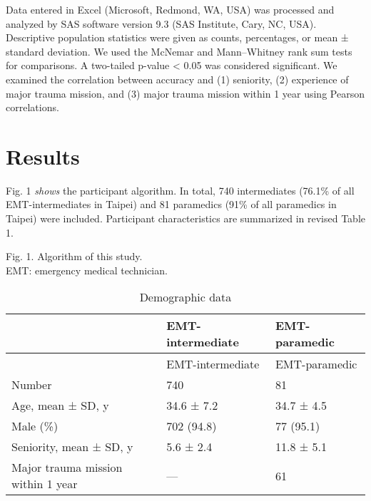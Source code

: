\documentclass[
  20pt
]{article}
\begin{document}
\begin{multicols}{2}
Data entered in Excel (Microsoft, Redmond, WA, USA) was processed and
analyzed by SAS software version 9.3 (SAS Institute, Cary, NC, USA).
Descriptive population statistics were given as counts, percentages, or
mean ± standard deviation. We used the McNemar and Mann--Whitney rank
sum tests for comparisons. A two-tailed p-value \textless{} 0.05 was
considered significant. We examined the correlation between accuracy and
(1) seniority, (2) experience of major trauma mission, and (3) major
trauma mission within 1 year using Pearson correlations.

\hypertarget{results}{%
\section{Results}\label{results}}

\end{multicols}

Fig. 1 \emph{shows} the participant algorithm. In total, 740
intermediates (76.1\% of all EMT-intermediates in Taipei) and 81
paramedics (91\% of all paramedics in Taipei) were included. Participant
characteristics are summarized in revised Table 1.

Fig. 1. Algorithm of this study.\\
EMT: emergency medical technician.

\begin{longtable}[]{@{}lll@{}}
\caption{Demographic data}\tabularnewline
\toprule
　 & EMT-intermediate & EMT-paramedic \\
\midrule
\endfirsthead
\toprule
　 & EMT-intermediate & EMT-paramedic \\
\midrule
\endhead
Number & 740 & 81 \\
Age, mean ± SD, y & 34.6 ± 7.2 & 34.7 ± 4.5 \\
Male (\%) & 702 (94.8) & 77 (95.1) \\
Seniority, mean ± SD, y & 5.6 ± 2.4 & 11.8 ± 5.1 \\
Major trauma mission within 1 year & --- & 61 \\
\bottomrule
\end{longtable}
\end{document}
